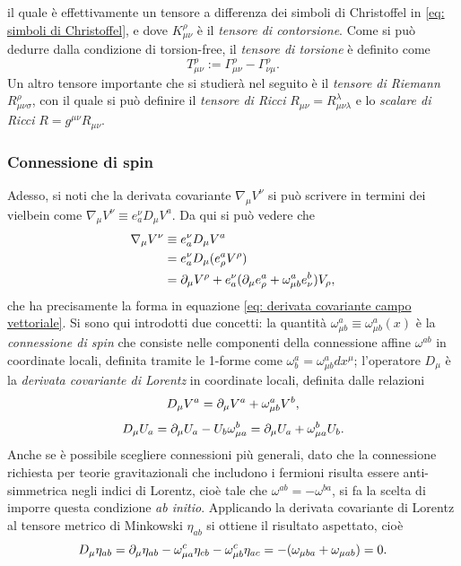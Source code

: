 il quale è effettivamente un tensore a differenza dei simboli di Christoffel in \eqref{eq: simboli di Christoffel}, e dove $K^\rho_{\mu\nu}$ è il \emph{tensore di contorsione}. Come si può dedurre dalla condizione di torsion-free, il \emph{tensore di torsione} è definito come
\begin{equation}
\label{eq: tensore di torsione}
    T^\rho_{\mu\nu} := \Gamma^\rho_{\mu\nu} - \Gamma^\rho_{\nu\mu}.
\end{equation}
Un altro tensore importante che si studierà nel seguito è il \emph{tensore di Riemann} $R^\rho_{\mu\nu\sigma}$, con il quale si può definire il \emph{tensore di Ricci} $R_{\mu\nu} = R^\lambda_{\mu\nu\lambda}$ e lo \emph{scalare di Ricci} $R = g^{\mu\nu}R_{\mu\nu}$.

\subsubsection{Connessione di spin}
Adesso, si noti che la derivata covariante $\nabla_\mu V^\nu$ si può scrivere in termini dei vielbein come $\nabla_\mu V^\nu \equiv e^\nu_a D_\mu V^a$. Da qui si può vedere che 
\begin{equation}
    \begin{split}
        \nabla_\mu V^\nu &\equiv e^\nu_a D_\mu V^a \\
        &= e^\nu_aD_\mu(e^a_\rho V^\rho) \\
        &= \partial_\mu V^\rho + e_a^\nu(\partial_\mu e^a_\rho + \omega^a_{\mu b}e^b_\nu)V_\rho,
    \end{split}
\end{equation}
che ha precisamente la forma in equazione \eqref{eq: derivata covariante campo vettoriale}. Si sono qui introdotti due concetti: la quantità $\omega^a_{\mu b} \equiv \omega^a_{\mu b}(x)$ è la \emph{connessione di spin} che consiste nelle componenti della connessione affine $\omega^{ab}$ in coordinate locali, definita tramite le 1-forme come $\omega^a_b = \omega^a_{\mu b} dx^\mu$; l'operatore $D_\mu$ è la \emph{derivata covariante di Lorentz} in coordinate locali, definita dalle relazioni
\begin{equation}
\label{eq: derivata di Lorentz campo vettoriale}
    D_\mu V^a = \partial_\mu V^a + \omega^a_{\mu b}V^b,
\end{equation}
\begin{equation}
\label{eq: derivata di Lorentz 1-forma}
    D_\mu U_a = \partial_\mu U_a - U_b\omega^b_{\mu a} = \partial_\mu U_a + \omega^b_{\mu a}U_b.
\end{equation}
Anche se è possibile scegliere connessioni più generali, dato che la connessione richiesta per teorie gravitazionali che includono i fermioni risulta essere anti-simmetrica negli indici di Lorentz, cioè tale che $\omega^{ab} = -\omega^{ba}$, si fa la scelta di imporre questa condizione \textit{ab initio}. Applicando la derivata covariante di Lorentz al tensore metrico di Minkowski $\eta_{ab}$ si ottiene il risultato aspettato, cioè
\begin{equation}
    D_\mu\eta_{ab} = \partial_\mu \eta_{ab} - \omega^c_{\mu a}\eta_{cb} - \omega^c_{\mu b}\eta_{ac} = -(\omega_{\mu ba} + \omega_{\mu ab}) = 0.
\end{equation}

